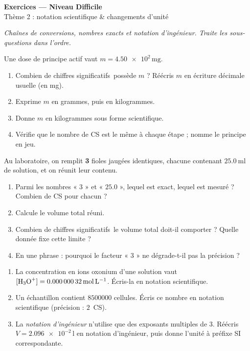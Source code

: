 \documentclass[11pt,a4paper]{article}
\newcommand{\CS}{chiffres significatifs}
\begin{document}
\begin{center}
{\Large\bfseries\color{primarydark} Exercices — Niveau Difficile}\\[1pt]
{\color{primary} Thème 2 : notation scientifique \& changements d'unité}
\end{center}
\vspace{1mm}
\textit{Chaînes de conversions, nombres exacts et notation d'ingénieur. Traite les sous-questions
dans l'ordre.}
\vspace{2mm}

\begin{exo}
Une dose de principe actif vaut $m = \num{4,50e2}\,\si{\milli\gram}$.
\begin{enumerate}[label=\alph*),leftmargin=1.6em,itemsep=1pt]
  \item Combien de \CS\ possède $m$ ? Réécris $m$ en écriture décimale usuelle (en mg).
  \item Exprime $m$ en grammes, puis en kilogrammes.
  \item Donne $m$ en kilogrammes sous forme scientifique.
  \item Vérifie que le nombre de CS est le même à chaque étape ; nomme le principe en jeu.
\end{enumerate}
\end{exo}

\begin{exo}
Au laboratoire, on remplit \textbf{3} fioles jaugées identiques, chacune contenant $\qty{25,0}{\milli\litre}$
de solution, et on réunit leur contenu.
\begin{enumerate}[label=\alph*),leftmargin=1.6em,itemsep=1pt]
  \item Parmi les nombres « $3$ » et « $\num{25,0}$ », lequel est exact, lequel est mesuré ? Combien
        de CS pour chacun ?
  \item Calcule le volume total réuni.
  \item Combien de \CS\ le volume total doit-il comporter ? Quelle donnée fixe cette limite ?
  \item En une phrase : pourquoi le facteur « $3$ » ne dégrade-t-il pas la précision ?
\end{enumerate}
\end{exo}

\begin{exo}
\begin{enumerate}[label=\alph*),leftmargin=1.6em,itemsep=1pt]
  \item La concentration en ions oxonium d'une solution vaut $[\ce{H3O+}]=\num{0,00000032}\,\si{\mol\per\litre}$.
        Écris-la en notation scientifique.
  \item Un échantillon contient $\num{8500000}$ cellules. Écris ce nombre en notation scientifique
        (précision : $2$~CS).
  \item La \emph{notation d'ingénieur} n'utilise que des exposants multiples de $3$. Réécris
        $V=\num{2,096e-2}\,\si{\litre}$ en notation d'ingénieur, puis donne l'unité à préfixe SI
        correspondante.
\end{enumerate}
\end{exo}
\end{document}
